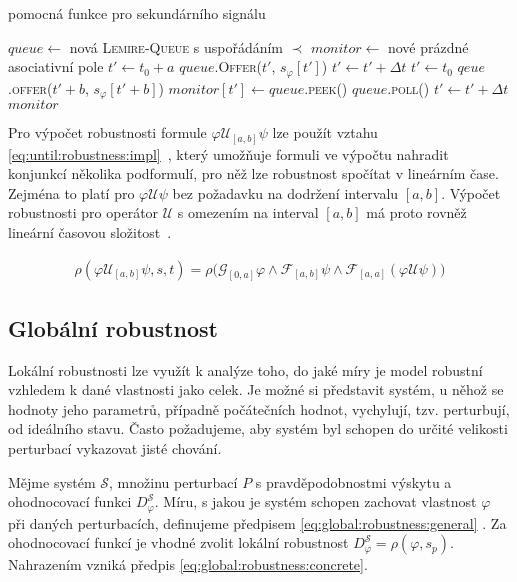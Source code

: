 \begin{algorithm}
\caption{pomocná funkce pro sekundárního signálu}
\label{algorithm:unary:signal}
\begin{algorithmic}[1]
	\State	$queue \gets $ nová \textsc{Lemire-Queue} s uspořádáním $\prec$
	\State	$monitor \gets$ nové prázdné asociativní pole
	\State	$t' \gets t_0 + a$
		\State $queue$.\textsc{Offer}($t'$, $s_\varphi[t']$)
		\State $t' \gets t' + \Delta t$
	\EndWhile
	\State	$t' \gets t_0$
		\State	$qeue$.\textsc{offer}($t' + b$, $s_\varphi[t' + b]$)
		\State	$monitor[t'] \gets queue$.\textsc{peek()}
			\State	$queue$.\textsc{poll()}
		\EndIf
		\State	$t' \gets t' + \Delta t$
	\EndWhile
	\State\Return $monitor$
\EndFunction
\end{algorithmic}
\end{algorithm}

Pro výpočet robustnosti formule $\varphi\mathcal{U}_{[a,b]}\psi$ lze použít vztahu \ref{eq:until:robustness:impl}~\cite{donze2010},
který umožňuje formuli ve výpočtu nahradit konjunkcí několika podformulí, pro něž lze robustnost spočítat v lineárním čase. Zejména 
to platí pro $\varphi\mathcal{U}\psi$ bez požadavku na dodržení intervalu $[a,b]$. Výpočet robustnosti pro operátor $\mathcal{U}$
s omezením na interval $[a,b]$ má proto rovněž lineární časovou složitost~\cite{donze2010}.

\begin{align}\label{eq:until:robustness:impl}
\rho(\varphi\mathcal{U}_{[a,b]}\psi, s, t) = \rho\Big(\mathcal{G}_{[0, a]}\varphi \wedge \mathcal{F}_{[a,b]}\psi \wedge \mathcal{F}_{[a,a]}(\varphi\mathcal{U}\psi)\Big)
\end{align}

\subsection{Globální robustnost}

Lokální robustnosti lze využít k analýze toho, do jaké míry je model robustní vzhledem
k dané vlastnosti jako celek. Je možné si představit systém, u něhož se hodnoty jeho parametrů, případně počátečních
hodnot, vychylují, tzv. perturbují, od ideálního stavu. Často požadujeme, aby systém byl schopen do určité velikosti
perturbací vykazovat jisté chování.

Mějme systém $\mathcal{S}$, množinu perturbací $P$ s pravděpodobnostmi výskytu a ohodnocovací funkci $D_\varphi^\mathcal{S}$.
Míru, s jakou je systém schopen zachovat vlastnost $\varphi$ při daných perturbacích,
definujeme předpisem \ref{eq:global:robustness:general} \cite{kitano2007}. Za ohodnocovací funkcí je vhodné zvolit lokální
robustnost $D_\varphi^\mathcal{S} = \rho(\varphi, s_p)$. Nahrazením vzniká předpis \ref{eq:global:robustness:concrete}.

